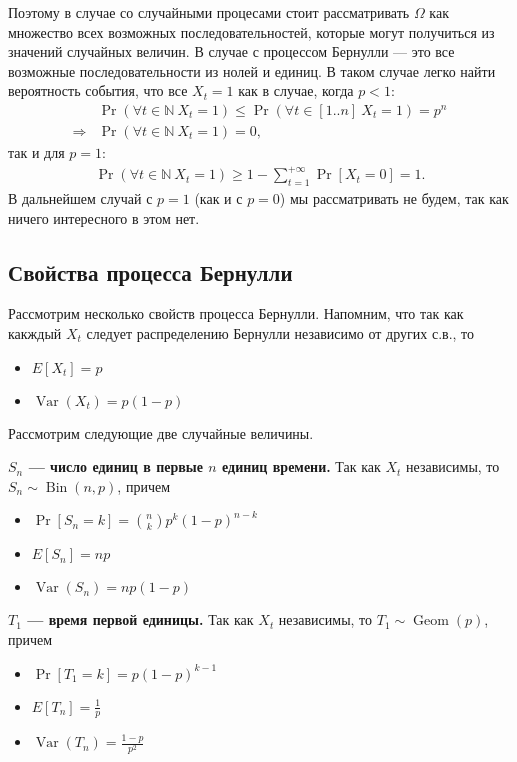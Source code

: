 \documentclass[12pt]{article}
\newcommand\N{\mathbb{N}}
\DeclareMathOperator{\Bin}{Bin}
\DeclareMathOperator{\Geom}{Geom}
\DeclareMathOperator{\Var}{Var}
\begin{document}
Поэтому в случае со случайными процесами стоит рассматривать $\Omega$ как множество всех возможных последовательностей, которые могут получиться из значений случайных величин. В случае с процессом Бернулли --- это все возможные последовательности из нолей и единиц. В таком случае легко найти вероятность события, что все $X_t = 1$ как в случае, когда $p < 1$:
\begin{align*}
  &\Pr(\forall t\in \N \ X_t = 1) \le \Pr(\forall t\in [1..n] \ X_t = 1) = p^n \\
  \Rightarrow& \Pr(\forall t\in \N \ X_t = 1) = 0,
\end{align*}
так и для $p = 1$:
\begin{align*}
  \Pr(\forall t\in \N \ X_t = 1) \ge 1 - \sum_{t = 1}^{+\infty} \Pr[X_t = 0] = 1.
\end{align*}
В дальнейшем случай с $p = 1$ (как и с $p = 0$) мы рассматривать не будем, так как ничего интересного в этом нет.

\subsection{Свойства процесса Бернулли}
Рассмотрим несколько свойств процесса Бернулли. Напомним, что так как какждый $X_t$ следует распределению Бернулли независимо от других с.в., то
\begin{itemize}
  \item $E[X_t] = p$
  \item $\Var(X_t) = p(1-p)$
\end{itemize}

Рассмотрим следующие две случайные величины.

\textbf{$S_n$ --- число единиц в первые $n$ единиц времени.} Так как $X_t$ независимы, то $S_n \sim \Bin(n, p)$, причем
\begin{itemize}
  \item $\Pr[S_n = k] = \binom{n}{k} p^k (1 - p)^{n - k}$
  \item $E[S_n] = np$
  \item $\Var(S_n) = np(1 - p)$
\end{itemize} 

\textbf{$T_1$ --- время первой единицы.} Так как $X_t$ независимы, то $T_1 \sim \Geom(p)$, причем
\begin{itemize}
  \item $\Pr[T_1 = k] = p (1 - p)^{k - 1}$
  \item $E[T_n] = \frac{1}{p}$
  \item $\Var(T_n) = \frac{1 - p}{p^2}$
\end{itemize} 
\end{document}
